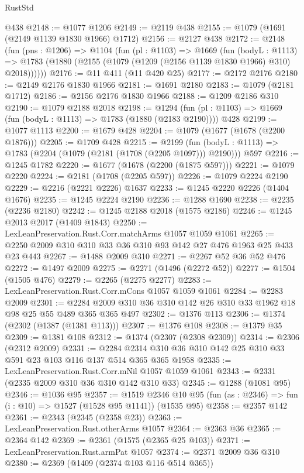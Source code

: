 \begin{lexlean}{RustStd}
\begin{coremodule}
    @438
@2148 := @1077 @1206
@2149 := @2119 @438
@2155 := @1079 (@1691 (@2149 @1139 @1830 @1966) @1712)
@2156 := @2127 @438
@2172 := @2148
    (fun (pns : @1206) =>
    @1104
      (fun (pl : @1103) =>
      @1669
        (fun (bodyL : @1113) =>
        @1783 (@1880 (@2155 (@1079 (@1209 (@2156 @1139 @1830 @1966) @310) @2018))))))
@2176 := @11 @411 (@11 @420 @25)
@2177 := @2172 @2176
@2180 := @2149 @2176 @1830 @1966
@2181 := @1691 @2180
@2183 := @1079 (@2181 @1712)
@2186 := @2156 @2176 @1830 @1966
@2188 := @1209 @2186 @310
@2190 := @1079 @2188 @2018
@2198 := @1294 (fun (pl : @1103) => @1669 (fun (bodyL : @1113) => @1783 (@1880 (@2183 @2190)))) @428
@2199 := @1077 @1113
@2200 := @1679 @428
@2204 := @1079 (@1677 (@1678 (@2200 @1876)))
@2205 := @1709 @428
@2215 := @2199
    (fun (bodyL : @1113) => @1783 (@2204 (@1079 (@2181 (@1708 (@2205 @1097))) @2190)))
    @597
@2216 := @1245 @1782
@2220 := @1677 (@1678 (@2200 (@1875 @597)))
@2221 := @1079 @2220
@2224 := @2181 (@1708 (@2205 @597))
@2226 := @1079 @2224 @2190
@2229 := @2216 (@2221 @2226) @1637
@2233 := @1245 @2220 @2226 (@1404 @1676)
@2235 := @1245 @2224 @2190
@2236 := @1288 @1690
@2238 := @2235 (@2236 @2180)
@2242 := @1245 @2188 @2018 (@1575 @2186)
@2246 := @1245 @2013 @2017 (@1409 @1843)
@2250 := LexLeanPreservation.Rust.Corr.matchArms @1057 @1059 @1061
@2265 := @2250 @2009 @310 @310 @33 @36 @310 @93 @142 @27 @476 @1963 @25 @433 @23 @443
@2267 := @1488 @2009 @310
@2271 := @2267 @52 @36 @52 @476
@2272 := @1497 @2009
@2275 := @2271 (@1496 (@2272 @52))
@2277 := @1504 (@1505 @476)
@2279 := @2265 (@2275 @2277)
@2283 := LexLeanPreservation.Rust.Corr.mCons @1057 @1059 @1061
@2284 := @2283 @2009
@2301 := @2284 @2009 @310 @36 @310 @142 @26 @310 @33 @1962 @18 @98 @25 @55 @489 @365 @365 @497
@2302 := @1376 @113
@2306 := @1374 (@2302 (@1387 (@1381 @113)))
@2307 := @1376 @108
@2308 := @1379 @35
@2309 := @1381 @108
@2312 := @1374 (@2307 (@2308 @2309))
@2314 := @2306 (@2312 @2009)
@2331 := @2284 @2314 @310 @36 @310 @142 @25 @310 @33 @591 @23 @103 @116 @137 @514 @365 @365 @1958
@2335 := LexLeanPreservation.Rust.Corr.mNil @1057 @1059 @1061
@2343 := @2331 (@2335 @2009 @310 @36 @310 @142 @310 @33)
@2345 := @1288 (@1081 @95)
@2346 := @1036 @95
@2357 := @1519
    @2346
    @10
    @95
    (fun (as : @2346) => fun (i : @10) => @1527 (@1528 @95 @1141))
    (@1535 @95)
@2358 := @2357 @142
@2361 := @2343 (@2345 (@2358 @23))
@2363 := LexLeanPreservation.Rust.otherArms @1057
@2364 := @2363 @36
@2365 := @2364 @142
@2369 := @2361 (@1575 (@2365 @25 @103))
@2371 := LexLeanPreservation.Rust.armPat @1057
@2374 := @2371 @2009 @36 @310
@2380 := @2369 (@1409 (@2374 @103 @116 @514 @365))

\end{coremodule}
\end{lexlean}
